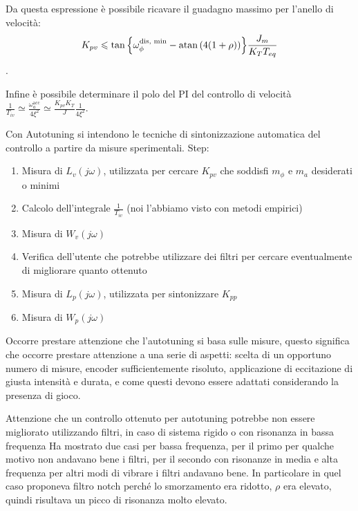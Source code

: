 Da questa espressione è possibile ricavare il guadagno massimo per l'anello di velocità: \[K_{pv} \leqslant \tan{\left\{\omega_\phi^\text{dis, min} - \operatorname{atan}\left( 4(1+\rho) \right) \right\}}\frac{J_m}{K_T T_{eq}} \].

Infine è possibile determinare il polo del PI del controllo di velocità \(\frac{1}{T_{iv}} \simeq \frac{\omega_a^\text{acc}}{4\xi^2} \simeq \frac{K_{pv}K_T}{J} \frac{1}{4\xi^2} \).

Con Autotuning si intendono le tecniche di sintonizzazione automatica del controllo a partire da misure sperimentali.
Step:
\begin{enumerate}
    \item Misura di \(L_v(j\omega)\), utilizzata per cercare \(K_{pv}\) che soddisfi \(m_\phi\) e \(m_a\) desiderati o minimi
    \item Calcolo dell'integrale \(\frac{1}{T_{iv}}\) (noi l'abbiamo visto con metodi empirici)
    \item Misura di \(W_v(j\omega)\)
    \item Verifica dell'utente che potrebbe utilizzare dei filtri per cercare eventualmente di migliorare quanto ottenuto
    \item Misura di \(L_p(j\omega)\), utilizzata per sintonizzare \(K_{pp}\)
    \item Misura di \(W_p(j\omega)\)
\end{enumerate}

Occorre prestare attenzione che l'autotuning si basa sulle misure, questo significa che occorre prestare attenzione a una serie di aspetti: scelta di un opportuno numero di misure, encoder sufficientemente risoluto, applicazione di eccitazione di giusta intensità e durata, e come questi devono essere adattati considerando la presenza di gioco.

Attenzione che un controllo ottenuto per autotuning potrebbe non essere migliorato utilizzando filtri, in caso di sistema rigido o con risonanza in bassa frequenza {\color{red} Ha mostrato due casi per bassa frequenza, per il primo per qualche motivo non andavano bene i filtri, per il secondo con risonanze in media e alta frequenza per altri modi di vibrare i filtri andavano bene. In particolare in quel caso proponeva filtro notch perché lo smorzamento era ridotto, \(\rho\) era elevato, quindi risultava un picco di risonanza molto elevato}.